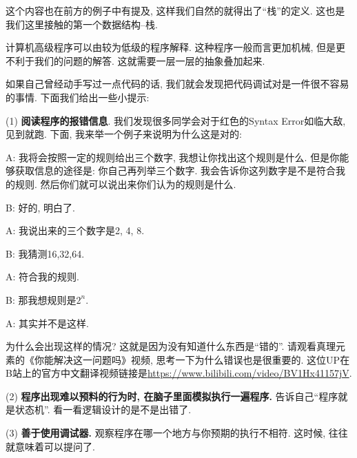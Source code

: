 这个内容也在前方的例子中有提及, 这样我们自然的就得出了``栈''的定义. 这也是我们这里接触的第一个数据结构--栈.

\begin{idea}
	计算机高级程序可以由较为低级的程序解释. 这种程序一般而言更加机械, 但是更不利于我们的问题的解答. 这就需要一层一层的抽象叠加起来. 
\end{idea}  

如果自己曾经动手写过一点代码的话, 我们就会发现把代码调试对是一件很不容易的事情. 下面我们给出一些小提示: 

(1) \textbf{阅读程序的报错信息}. 我们发现很多同学会对于红色的Syntax Error如临大敌, 见到就跑. 下面, 我来举一个例子来说明为什么这是对的: 

\begin{dialogue}
	A: 我将会按照一定的规则给出三个数字, 我想让你找出这个规则是什么. 但是你能够获取信息的途径是: 你自己再列举三个数字. 我会告诉你这列数字是不是符合我的规则. 然后你们就可以说出来你们认为的规则是什么. 
	
	B: 好的, 明白了. 
	
	A: 我说出来的三个数字是2, 4, 8. 
	
	B: 我猜测16,32,64.
	
	A: 符合我的规则.
	
	B: 那我想规则是$2^n$. 
	
	A: 其实并不是这样. 
\end{dialogue}

为什么会出现这样的情况? 这就是因为没有知道什么东西是``错的''. 请观看真理元素的《你能解决这一问题吗》视频, 思考一下为什么错误也是很重要的. 这位UP在B站上的官方中文翻译视频链接是\url{https://www.bilibili.com/video/BV1Hx41157jV}. 

(2) \textbf{程序出现难以预料的行为时, 在脑子里面模拟执行一遍程序.} 告诉自己``程序就是状态机''. 看一看逻辑设计的是不是出错了. 

(3) \textbf{善于使用调试器.} 观察程序在哪一个地方与你预期的执行不相符. 这时候, 往往就意味着可以提问了. 

